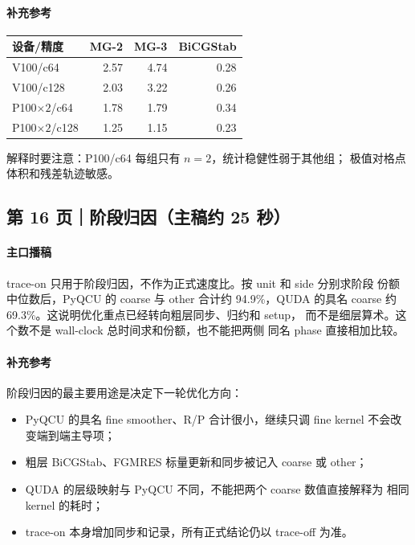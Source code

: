 \documentclass[UTF8,a4paper,11pt,fontset=none]{ctexart}
\begin{document}
\paragraph{补充参考}
\begin{center}
\begin{tabular}{@{}lrrr@{}}
\toprule
设备/精度 & MG-2 & MG-3 & BiCGStab\\
\midrule
V100/c64 & 2.57 & 4.74 & 0.28\\
V100/c128 & 2.03 & 3.22 & 0.26\\
P100\(\times2\)/c64 & 1.78 & 1.79 & 0.34\\
P100\(\times2\)/c128 & 1.25 & 1.15 & 0.23\\
\bottomrule
\end{tabular}
\end{center}
解释时要注意：P100/c64 每组只有 \(n=2\)，统计稳健性弱于其他组；
极值对格点体积和残差轨迹敏感。

\subsection{第 16 页｜阶段归因（主稿约 25 秒）}

\paragraph{主口播稿}
trace-on 只用于阶段归因，不作为正式速度比。按 unit 和 side 分别求阶段
份额中位数后，PyQCU 的 coarse 与 other 合计约 94.9\%，QUDA 的具名
coarse 约 69.3\%。这说明优化重点已经转向粗层同步、归约和 setup，
而不是细层算术。这个数不是 wall-clock 总时间求和份额，也不能把两侧
同名 phase 直接相加比较。

\paragraph{补充参考}
阶段归因的最主要用途是决定下一轮优化方向：
\begin{itemize}
  \item PyQCU 的具名 fine smoother、R/P 合计很小，继续只调 fine kernel
        不会改变端到端主导项；
  \item 粗层 BiCGStab、FGMRES 标量更新和同步被记入 coarse 或 other；
  \item QUDA 的层级映射与 PyQCU 不同，不能把两个 coarse 数值直接解释为
        相同 kernel 的耗时；
  \item trace-on 本身增加同步和记录，所有正式结论仍以 trace-off 为准。
\end{itemize}
\end{document}
